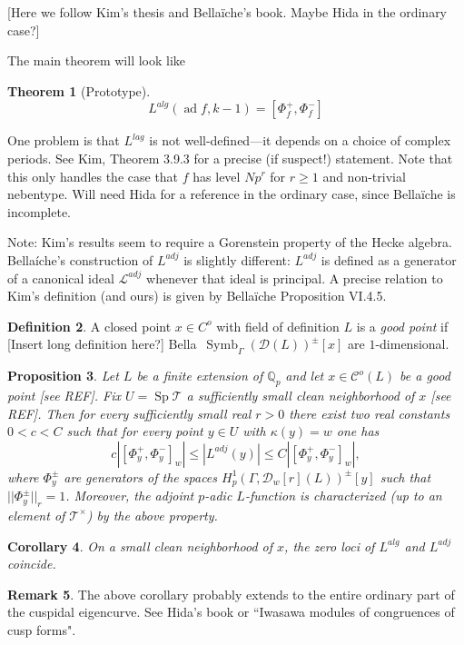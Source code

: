 \documentclass[10pt]{amsart}
\theoremstyle{plain}
\newtheorem{theorem}{Theorem}[section]
\newtheorem{proposition}[theorem]{Proposition}
\newtheorem{corollary}[theorem]{Corollary}
\theoremstyle{definition}
\newtheorem{definition}[theorem]{Definition}
\newtheorem{remark}[theorem]{Remark}
\newcommand{\QQ}{{\mathbb{Q}}}
\newcommand{\cD}{\mathcal{D}}
\DeclareMathOperator{\Symb}{Symb}
\DeclareMathOperator{\ad}{ad}
\DeclareMathOperator{\Sp}{Sp}
\begin{document}
[Here we follow Kim's thesis and Bella\"iche's book. Maybe Hida in the ordinary case?]

The main theorem will look like
\begin{theorem}[Prototype]
\begin{equation}
	L^{alg}(\ad f , k-1) = [\Phi_{f}^+,\Phi_{f}^-]
\end{equation}
\end{theorem}
One problem is that $L^{lag}$ is not well-defined---it depends on a choice of complex periods. See Kim, Theorem 3.9.3 for a precise (if suspect!) statement. Note that this only handles the case that $f$ has level $Np^r$ for $r\geq 1$ and non-trivial nebentype. Will need Hida for a reference in the ordinary case, since Bella\"iche is incomplete.

Note: Kim's results seem to require a Gorenstein property of the Hecke algebra. Bella\'iche's construction of $L^{adj}$ is slightly different: $L^{adj}$ is defined as a generator of a canonical ideal $\mathcal{L}^{adj}$ whenever that ideal is principal. A precise relation to Kim's definition (and ours) is given by Bella\"iche Proposition VI.4.5.

\begin{definition}
A closed point $x\in C^o$ with field of definition $L$ is a \emph{good point} if [Insert long definition here?]
Bella\ $\Symb_\Gamma(\cD(L))^\pm[x]$ are $1$-dimensional.
\end{definition}

\begin{proposition}
Let $L$ be a finite extension of $\QQ_p$ and let $x\in \mathcal{C}^o(L)$ be a good point [see REF]. Fix $U=\Sp\mathcal{T}$ a sufficiently small clean neighborhood of $x$ [see REF]. Then for every sufficiently small real $r>0$ there exist two real constants $0<c<C$ such that for every point $y\in U$ with $\kappa(y)=w$ one has
\begin{equation}
	c| [\Phi_{y}^+, \Phi_y^-]_w | \leq |L^{adj}(y) | \leq C | [\Phi_y^+, \Phi_y^-]_w|,
\end{equation}
where $\Phi_{y}^\pm$ are generators of the spaces $H^1_p(\Gamma,\cD_w[r](L))^{\pm}[y]$ such that $||\Phi_y^\pm||_r = 1$. Moreover, the adjoint $p$-adic $L$-function is characterized (up to an element of $\mathcal{T}^\times$) by the above property.
\end{proposition}

\begin{corollary}
On a small clean neighborhood of $x$, the zero loci of $L^{alg}$ and $L^{adj}$ coincide.
\end{corollary}

\begin{remark}
The above corollary probably extends to the entire ordinary part of the cuspidal eigencurve. See Hida's book or ``Iwasawa modules of congruences of cusp forms".
\end{remark}
\end{document}
